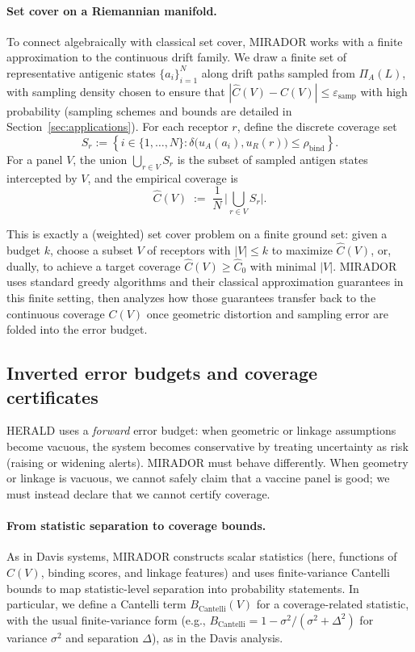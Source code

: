 \documentclass[11pt]{article}
\begin{document}
\paragraph{Set cover on a Riemannian manifold.}
To connect algebraically with classical set cover, MIRADOR works with a finite approximation to
the continuous drift family. We draw a finite set of representative antigenic states
$\{a_i\}_{i=1}^N$ along drift paths sampled from $\Pi_A(L)$, with sampling density chosen to ensure
that $|\widehat{C}(V) - C(V)| \le \varepsilon_{\text{samp}}$ with high probability (sampling schemes and
bounds are detailed in Section~\ref{sec:applications}). For each receptor $r$, define the discrete
coverage set
\[
S_r
:= \left\{ i \in \{1,\dots,N\} :
\delta\bigl(u_A(a_i), u_R(r)\bigr) \le \rho_{\text{bind}}\right\}.
\]
For a panel $V$, the union $\bigcup_{r\in V} S_r$ is the subset of sampled antigen states intercepted
by $V$, and the empirical coverage is
\[
\widehat{C}(V)
\;:=\;
\frac{1}{N}\, \bigl|\bigcup_{r\in V} S_r\bigr|.
\]

This is exactly a (weighted) set cover problem on a finite ground set:
given a budget $k$, choose a subset $V$ of receptors with $|V|\le k$ to maximize $\widehat{C}(V)$,
or, dually, to achieve a target coverage $\widehat{C}(V)\ge \widehat{C}_0$ with minimal $|V|$.
MIRADOR uses standard greedy algorithms and their classical approximation guarantees in this
finite setting, then analyzes how those guarantees transfer back to the continuous coverage $C(V)$
once geometric distortion and sampling error are folded into the error budget.

\subsection{Inverted error budgets and coverage certificates}

HERALD uses a \emph{forward} error budget: when geometric or linkage assumptions become
vacuous, the system becomes conservative by treating uncertainty as risk (raising or widening
alerts). MIRADOR must behave differently. When geometry or linkage is vacuous,
we cannot safely claim that a vaccine panel is good; we must instead declare that we cannot certify
coverage.

\paragraph{From statistic separation to coverage bounds.}
As in Davis systems, MIRADOR constructs scalar statistics (here, functions of
$\widehat{C}(V)$, binding scores, and linkage features) and uses finite-variance Cantelli bounds
to map statistic-level separation into probability statements. In particular, we define a Cantelli
term $B_{\text{Cantelli}}(V)$ for a coverage-related statistic, with the usual finite-variance form
(e.g.,
$B_{\text{Cantelli}} = 1 - \sigma^2/(\sigma^2 + \Delta^2)$ for variance $\sigma^2$ and separation $\Delta$),
as in the Davis analysis.\ 
\end{document}
